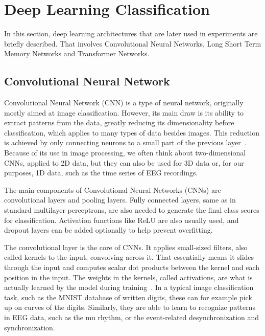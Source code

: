 \documentclass[english, he, bc, kiv, iso690alph]{fasthesis}
\begin{document}

\section{Deep Learning Classification}

In this section, deep learning architectures that are later used in experiments are briefly described. That involves Convolutional Neural Networks, Long Short Term Memory Networks and Transformer Networks.


\subsection{Convolutional Neural Network}

Convolutional Neural Network (CNN) is a type of neural network, originally mostly aimed at image classification. However, its main draw is its ability to extract patterns from the data, greatly reducing its dimensionality before classification, which applies to many types of data besides images. This reduction is achieved by only connecting neurons to a small part of the previous layer~\cite{oshea:cnn:15}. Because of its use in image processing, we often think about two-dimensional CNNs, applied to 2D data, but they can also be used for 3D data or, for our purposes, 1D data, such as the time series of EEG recordings.

The main components of Convolutional Neural Networks (CNNs) are convolutional layers and pooling layers. Fully connected layers, same as in standard multilayer perceptrons, are also needed to generate the final class scores for classification. Activation functions like ReLU are also usually used, and dropout layers can be added optionally to help prevent overfitting.

The convolutional layer is the core of CNNs. It applies small-sized filters, also called kernels to the input, convolving across it. That essentially means it slides through the input and computes scalar dot products between the kernel and each position in the input. The weights in the kernels, called activations, are what is actually learned by the model during training~\cite{oshea:cnn:15}. In a typical image classification task, such as the MNIST database of written digits, these can for example pick up on curves of the digits. Similarly, they are able to learn to recognize patterns in EEG data, such as the mu rhythm, or the event-related desynchronization and synchronization.
\end{document}
